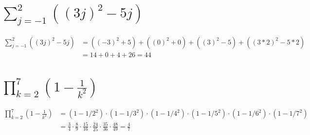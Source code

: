 \begin{parts}
    \part{
        $\sum_{j=-1}^2{\left((3j)^2-5j\right)}$
    }
    \begin{solution}
        \begin{align*}
            \sum_{j=-1}^2{\left((3j)^2-5j\right)} &=
            \left((-3)^2+5\right) +
            \left((0)^2+0\right) +
            \left((3)^2-5\right) +
            \left((3*2)^2-5*2\right)\\
            & = 14+0+4+26 = 44
        \end{align*}
    \end{solution}

    \part{
        $\prod_{k=2}^7{\left(1-\frac{1}{k^2}\right)}$
    }
    \begin{solution}
        \begin{align*}
            \prod_{k=2}^7{\left(1-\frac{1}{k^2}\right)} &=
            \left(1-1/2^2\right)\cdot
            \left(1-1/3^2\right)\cdot
            \left(1-1/4^2\right)\cdot
            \left(1-1/5^2\right)\cdot
            \left(1-1/6^2\right)\cdot
            \left(1-1/7^2\right)\\
            & = \frac{3}{4} \cdot
            \frac{8}{9} \cdot
            \frac{15}{16} \cdot
            \frac{24}{25} \cdot
            \frac{35}{36} \cdot
            \frac{48}{49}=\frac{4}{7}
        \end{align*}
    \end{solution}
\end{parts}